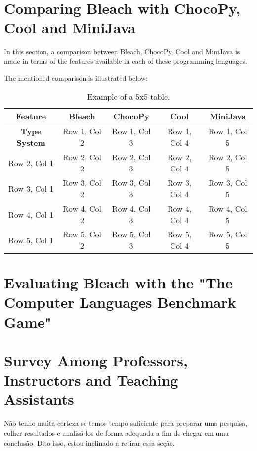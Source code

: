 \section{Comparing Bleach with ChocoPy, Cool and MiniJava}
In this section, a comparison between Bleach, ChocoPy, Cool and MiniJava is made in terms of the features available in each of these programming languages.

The mentioned comparison is illustrated below:

\begin{table}[h!]
    \centering
    \begin{tabular}{|c|c|c|c|c|}
        \hline
        \textbf{Feature} & \textbf{Bleach} & \textbf{ChocoPy} & \textbf{Cool} & \textbf{MiniJava} \\  %
        \hline
        \textbf{Type System} & Row 1, Col 2 & Row 1, Col 3 & Row 1, Col 4 & Row 1, Col 5 \\  %
        \hline
        Row 2, Col 1 & Row 2, Col 2 & Row 2, Col 3 & Row 2, Col 4 & Row 2, Col 5 \\
        \hline
        Row 3, Col 1 & Row 3, Col 2 & Row 3, Col 3 & Row 3, Col 4 & Row 3, Col 5 \\
        \hline
        Row 4, Col 1 & Row 4, Col 2 & Row 4, Col 3 & Row 4, Col 4 & Row 4, Col 5 \\
        \hline
        Row 5, Col 1 & Row 5, Col 2 & Row 5, Col 3 & Row 5, Col 4 & Row 5, Col 5 \\
        \hline
    \end{tabular}
    \caption{Example of a 5x5 table.}
    \label{tab:example5x5}
\end{table}


\section{Evaluating Bleach with the "The Computer Languages Benchmark Game"}

\section{Survey Among Professors, Instructors and Teaching Assistants}
Não tenho muita certeza se temos tempo suficiente para preparar uma pesquisa, colher resultados e analisá-los de forma adequada a fim de chegar em uma conclusão. Dito isso, estou inclinado a retirar essa seção.